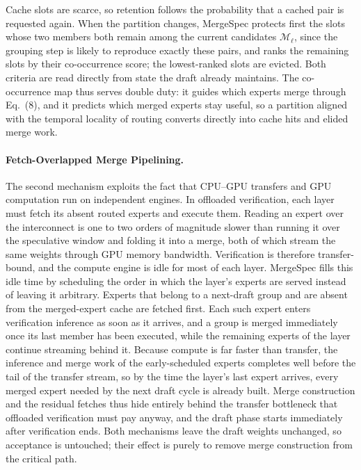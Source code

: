 Cache slots are scarce, so retention follows the probability that a
cached pair is requested again. When the partition changes, MergeSpec
protects first the slots whose two members both remain among the
current candidates $\mathcal{M}_{\ell}$, since the grouping step is
likely to reproduce exactly these pairs, and ranks the remaining slots
by their co-occurrence score; the lowest-ranked slots are evicted.
Both criteria are read directly from state the draft already
maintains. The co-occurrence map thus serves double duty: it guides
which experts merge through Eq.~(8), and it predicts which merged
experts stay useful, so a partition aligned with the temporal locality
of routing converts directly into cache hits and elided merge work.

\paragraph{Fetch-Overlapped Merge Pipelining.}
The second mechanism exploits the fact that CPU--GPU transfers and GPU
computation run on independent engines. In offloaded verification, each
layer must fetch its absent routed experts and execute them. Reading an
expert over the interconnect is one to two orders of magnitude slower
than running it over the speculative window and folding it into a
merge, both of which stream the same weights through GPU memory
bandwidth. Verification is therefore transfer-bound, and the compute
engine is idle for most of each layer. MergeSpec fills this idle time
by scheduling the order in which the layer's experts are served instead
of leaving it arbitrary. Experts that belong to a next-draft group and
are absent from the merged-expert cache are fetched first. Each such
expert enters verification inference as soon as it arrives, and a group
is merged immediately once its last member has been executed, while the
remaining experts of the layer continue streaming behind it. Because
compute is far faster than transfer, the inference and merge work of
the early-scheduled experts completes well before the tail of the
transfer stream, so by the time the layer's last expert arrives, every
merged expert needed by the next draft cycle is already built. Merge
construction and the residual fetches thus hide entirely behind the
transfer bottleneck that offloaded verification must pay anyway, and
the draft phase starts immediately after verification ends. Both
mechanisms leave the draft weights unchanged, so acceptance is
untouched; their effect is purely to remove merge construction from the
critical path.
